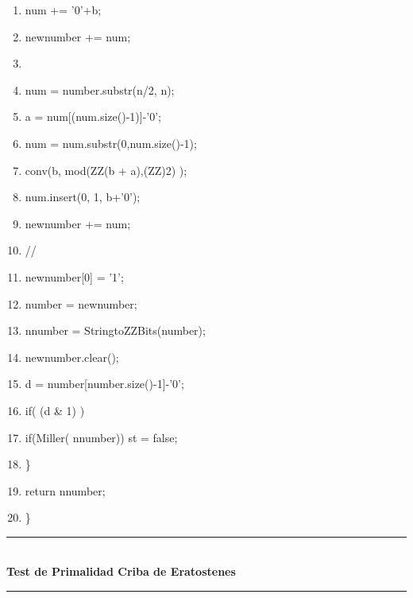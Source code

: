 \documentclass[11pt, conference]{IEEEtran}
\begin{document}
\begin{enumerate}
	\item \qquad\qquad num += '0'+b;
	\item \qquad\qquad newnumber += num;
	\item		
	\item \qquad\qquad num = number.substr(n/2, n);
	\item \qquad\qquad a = num[(num.size()-1)]-'0';
	\item \qquad\qquad num = num.substr(0,num.size()-1);
	\item \qquad\qquad conv(b, mod(ZZ(b + a),(ZZ)2) );
	\item \qquad\qquad num.insert(0, 1, b+'0');		
	\item \qquad\qquad newnumber += num;
	\item \qquad\qquad //
	\item \qquad\qquad newnumber[0] = '1';
	\item \qquad\qquad number = newnumber;
	\item \qquad\qquad nnumber = StringtoZZBits(number);
	\item \qquad\qquad newnumber.clear();
	\item \qquad\qquad d = number[number.size()-1]-'0';
	\item \qquad\qquad if( (d \& 1) )
	\item \qquad\qquad\qquad if(Miller( nnumber)) st = false;
	\item \qquad\}
	\item \qquad return nnumber;
	\item \}
\end{enumerate}
\rule[0mm]{181mm}{0.1mm}\\
\textbf{Test de Primalidad Criba de Eratostenes}\\
\rule[3mm]{181mm}{0.1mm}\\
\end{document}
